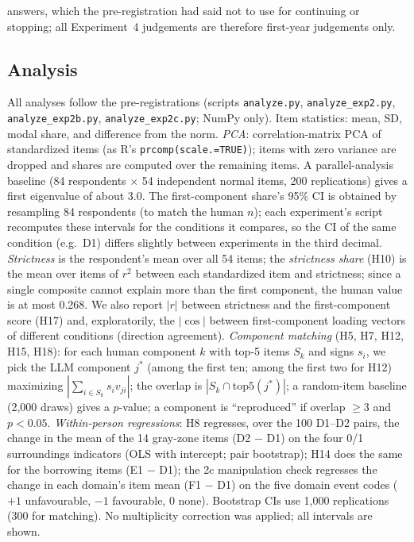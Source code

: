 \documentclass[11pt]{article}
\begin{document}
answers, which the pre-registration had said not to use for continuing or stopping; all Experiment~4 judgements are therefore first-year judgements only.

\subsection{Analysis}
All analyses follow the pre-registrations (scripts \texttt{analyze.py}, \texttt{analyze\_exp2.py}, \texttt{analyze\_exp2b.py}, \texttt{analyze\_exp2c.py}; NumPy only). Item statistics: mean, SD, modal share, and difference from the norm. \emph{PCA}: correlation-matrix PCA of standardized items (as R's \texttt{prcomp(scale.=TRUE)}); items with zero variance are dropped and shares are computed over the remaining items. A parallel-analysis baseline (84 respondents $\times$ 54 independent normal items, 200 replications) gives a first eigenvalue of about 3.0. The first-component share's 95\% CI is obtained by resampling 84 respondents (to match the human $n$); each experiment's script recomputes these intervals for the conditions it compares, so the CI of the same condition (e.g.\ D1) differs slightly between experiments in the third decimal. \emph{Strictness} is the respondent's mean over all 54 items; the \emph{strictness share} (H10) is the mean over items of $r^2$ between each standardized item and strictness; since a single composite cannot explain more than the first component, the human value is at most 0.268. We also report $|r|$ between strictness and the first-component score (H17) and, exploratorily, the $|\cos|$ between first-component loading vectors of different conditions (direction agreement). \emph{Component matching} (H5, H7, H12, H15, H18): for each human component $k$ with top-5 items $S_k$ and signs $s_i$, we pick the LLM component $j^*$ (among the first ten; among the first two for H12) maximizing $|\sum_{i\in S_k} s_i v_{ji}|$; the overlap is $|S_k \cap \mathrm{top5}(j^*)|$; a random-item baseline (2{,}000 draws) gives a $p$-value; a component is ``reproduced'' if overlap $\ge 3$ and $p < 0.05$. \emph{Within-person regressions}: H8 regresses, over the 100 D1--D2 pairs, the change in the mean of the 14 gray-zone items (D2 $-$ D1) on the four 0/1 surroundings indicators (OLS with intercept; pair bootstrap); H14 does the same for the borrowing items (E1 $-$ D1); the 2c manipulation check regresses the change in each domain's item mean (F1 $-$ D1) on the five domain event codes ($+1$ unfavourable, $-1$ favourable, 0 none). Bootstrap CIs use 1{,}000 replications (300 for matching). No multiplicity correction was applied; all intervals are shown.
\end{document}
